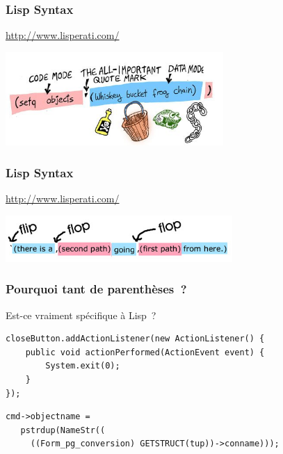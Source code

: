 \documentclass{beamer}
\begin{document}
\begin{frame}[fragile]
  \frametitle{Lisp Syntax}
  \begin{center}
      \url{http://www.lisperati.com/}

    \includegraphics[height=1.4in]{game-objects.jpg}
  \end{center}
\end{frame}

\begin{frame}[fragile]
  \frametitle{Lisp Syntax}
  \begin{center}
    \url {http://www.lisperati.com/}

    \includegraphics[height=0.7in]{back-quote.jpg}
  \end{center}
\end{frame}

\begin{frame}[fragile]
  \frametitle{Pourquoi tant de parenthèses ?}

  \begin{center}
    Est-ce vraiment spécifique à Lisp ?
  \end{center}

  \begin{example}[java]
\begin{verbatim}
closeButton.addActionListener(new ActionListener() {
    public void actionPerformed(ActionEvent event) {
        System.exit(0);
    }
});
\end{verbatim}
  \end{example}

  \begin{example}[C]
\begin{verbatim}
cmd->objectname =
   pstrdup(NameStr((
     ((Form_pg_conversion) GETSTRUCT(tup))->conname)));
\end{verbatim}
  \end{example}

\end{frame}
\end{document}
